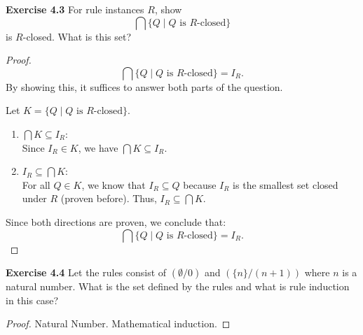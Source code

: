\begin{question}
    \textbf{Exercise 4.3} For rule instances \( R \), show
    \[
    \bigcap \{ Q \mid Q \text{ is } R\text{-closed} \}
    \]
    is \( R \)-closed. What is this set?
\end{question}
\begin{proof}
    \[
    \bigcap \{ Q \mid Q \text{ is } R\text{-closed} \} = I_R.
    \]
    By showing this, it suffices to answer both parts of the question.

    Let \( K = \{ Q \mid Q \text{ is } R\text{-closed} \} \).

    \begin{enumerate}
        \item \(\bigcap K \subseteq I_R\): \\
        Since \( I_R \in K \), we have \( \bigcap K \subseteq I_R \).

        \item \( I_R \subseteq \bigcap K \): \\
        For all \( Q \in K \), we know that \( I_R \subseteq Q \) because \( I_R \) is the smallest set closed under \( R \) (proven before). Thus, \( I_R \subseteq \bigcap K \).
    \end{enumerate}

    Since both directions are proven, we conclude that:
    \[
    \bigcap \{ Q \mid Q \text{ is } R\text{-closed} \} = I_R.
    \]
\end{proof}

\begin{question}
    \textbf{Exercise 4.4} Let the rules consist of \( (\emptyset / 0) \) and \( (\{n\} / (n + 1)) \) where \( n \) is a natural number. What is the set defined by the rules and what is rule induction in this case?
\end{question}
\begin{proof}
    Natural Number. Mathematical induction.
\end{proof}
